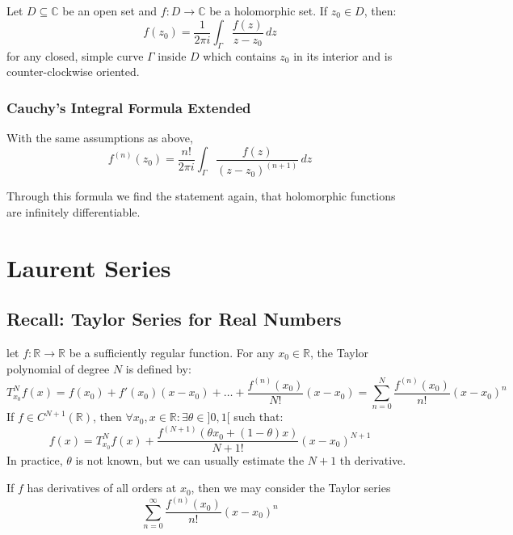 Let $D \subseteq\mathbb C$ be an open set and $f:D\to \mathbb C$ be a holomorphic set. If $z_0\in D$, then:
\begin{equation*}
\boxed{f(z_0) = \frac 1{2\pi i} \int_\Gamma \frac{f(z)}{z-z_0}\,dz}
\end{equation*}
for any closed, simple curve $\Gamma$ inside $D$ which contains $z_0$ in its interior and is counter-clockwise oriented.

\subsubsection{Cauchy's Integral Formula Extended}

With the same assumptions as above,
\begin{equation*}
	f^{(n)}(z_0) = \frac{n!}{2\pi i}\int_{\Gamma} \frac{f(z)}{(z-z_0)^{(n + 1)}} \,dz
\end{equation*}

Through this formula we find the statement again, that holomorphic functions are infinitely differentiable.


\section{Laurent Series}

\subsection{Recall: Taylor Series for Real Numbers}
let $f:\mathbb R \to \mathbb R$ be a sufficiently regular function. For any $x_0\in \mathbb R$, the Taylor polynomial of degree $N$ is defined by:
\begin{equation*}
	T_{x_0}^Nf(x)=f(x_0)+ f'(x_0)(x-x_0)+\dots + \frac{f^{(n)}(x_0)}{N! }(x-x_0) = \sum_{n=0}^N \frac{f^{(n)}(x_0)}{n!}(x-x_0)^n
\end{equation*}
If $f\in C^{N+1}(\mathbb R)$, then $\forall x_0,x\in\mathbb R: \exists \theta \in]0,1[$ such that:
\begin{equation*}
	f(x)= T_{x_0}^N f(x)+ \frac{f^{(N+1)}(\theta x_0+(1-\theta)x)}{N+1!}(x-x_0)^{N+1}
\end{equation*}
In practice, $\theta$ is not known, but we can usually estimate the $N+1$ th derivative.

If $f$ has derivatives of all orders at $x_0$, then we may consider the Taylor series
\begin{equation*}
	\sum_{n=0}^\infty \frac{f^{(n)}(x_0)}{n!}(x-x_0)^n
\end{equation*}

